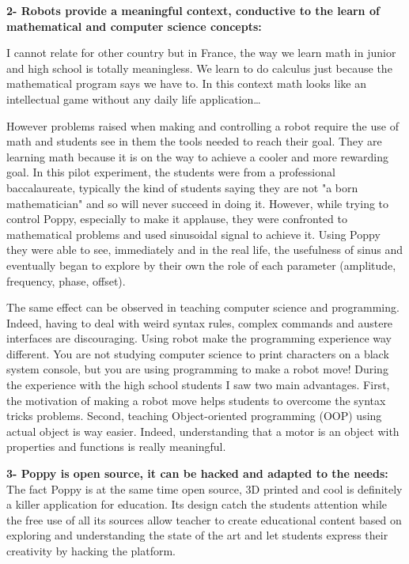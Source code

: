 \textbf{2- Robots provide a meaningful context, conductive to the learn of mathematical and computer science concepts:}

I cannot relate for other country but in France, the way we learn math in junior and high school is totally meaningless. We learn to do calculus just because the mathematical program says we have to. In this context math looks like an intellectual game without any daily life application\dots

However problems raised when making and controlling a robot require the use of math and students see in them the tools needed to reach their goal. They are learning math because it is on the way to achieve a cooler and more rewarding goal. In this pilot experiment, the students were from a professional baccalaureate, typically the kind of students saying they are not "a born mathematician" and so will never succeed in doing it. However, while trying to control Poppy, especially to make it applause, they were confronted to mathematical problems and used sinusoidal signal to achieve it. Using Poppy they were able to see, immediately and in the real life, the usefulness of sinus and eventually began to explore by their own the role of each parameter (amplitude, frequency, phase, offset).

The same effect can be observed in teaching computer science and programming. Indeed, having to deal with weird syntax rules, complex commands and austere interfaces are discouraging. Using robot make the programming experience way different. You are not studying computer science to print characters on a black system console, but you are using programming to make a robot move!
During the experience with the high school students I saw two main advantages. First, the motivation of making a robot move helps students to overcome the syntax tricks problems. Second, teaching Object-oriented programming (OOP) using actual object is way easier. Indeed, understanding that a motor is an object with properties and functions is really meaningful.


\textbf{3- Poppy is open source, it can be hacked and adapted to the needs:}
The fact Poppy is at the same time open source, 3D printed and cool is definitely a killer application for education. Its design catch the students attention while the free use of all its sources allow teacher to create educational content based on exploring and understanding the state of the art and let students express their creativity by hacking the platform.


